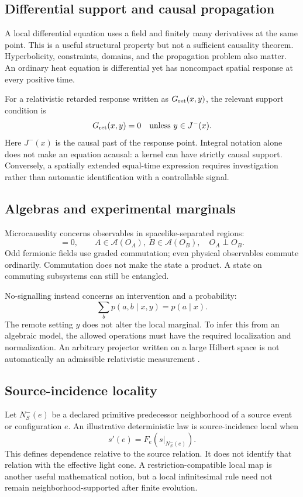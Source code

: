 \documentclass[11pt,a4paper]{article}
\begin{document}
\subsection{Differential support and causal propagation}
A local differential equation uses a field and finitely many derivatives at the same point. This is a useful structural property but not a sufficient causality theorem. Hyperbolicity, constraints, domains, and the propagation problem also matter. An ordinary heat equation is differential yet has noncompact spatial response at every positive time.

For a relativistic retarded response written as \(G_{\rm ret}(x,y)\), the relevant support condition is
\begin{equation}
G_{\rm ret}(x,y)=0\quad\hbox{unless }y\in J^-(x).
\end{equation}
Here \(J^-(x)\) is the causal past of the response point. Integral notation alone does not make an equation acausal: a kernel can have strictly causal support. Conversely, a spatially extended equal-time expression requires investigation rather than automatic identification with a controllable signal.

\subsection{Algebras and experimental marginals}
Microcausality concerns observables in spacelike-separated regions:
\begin{equation}
[A,B]=0,\qquad A\in\mathcal A(O_A),\ B\in\mathcal A(O_B),
\quad O_A\perp O_B.
\end{equation}
Odd fermionic fields use graded commutation; even physical observables commute ordinarily. Commutation does not make the state a product. A state on commuting subsystems can still be entangled.

No-signalling instead concerns an intervention and a probability:
\begin{equation}
\sum_b p(a,b\mid x,y)=p(a\mid x).
\label{eq:nosignal}
\end{equation}
The remote setting \(y\) does not alter the local marginal. To infer this from an algebraic model, the allowed operations must have the required localization and normalization. An arbitrary projector written on a large Hilbert space is not automatically an admissible relativistic measurement \cite{FewsterVerch}.

\subsection{Source-incidence locality}
Let \(N_S^-(e)\) be a declared primitive predecessor neighborhood of a source event or configuration \(e\). An illustrative deterministic law is source-incidence local when
\begin{equation}
s'(e)=F_e\!\left(s|_{N_S^-(e)}\right).
\end{equation}
This defines dependence relative to the source relation. It does not identify that relation with the effective light cone. A restriction-compatible local map is another useful mathematical notion, but a local infinitesimal rule need not remain neighborhood-supported after finite evolution.
\end{document}
